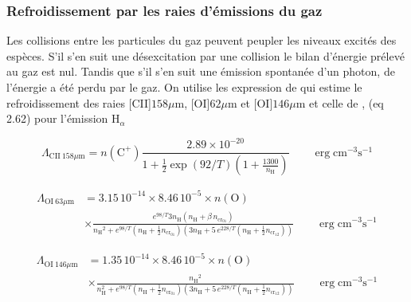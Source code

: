 


\subsubsection{Refroidissement par les raies d'émissions du gaz}

Les collisions entre les particules du gaz peuvent peupler les niveaux excités des espèces. S'il s'en suit une désexcitation par une collision le bilan d'énergie prélevé au gaz est nul. Tandis que s'il s'en suit une émission spontanée d'un photon, de l'énergie a été perdu par le gaz. On utilise les expression de \cite{Rollig2005} qui estime le refroidissement des raies [CII]$158 \mu \mathrm{m}$, [OI]$62 \mu \mathrm{m}$ et [OI]$146 \mu \mathrm{m}$ et celle de \cite{tielens2005}, (eq 2.62) pour l'émission $\mathrm{H}_\alpha$

\begin{equation}
    \Lambda_{\mathrm{CII}\ 158   \mu \mathrm{m}}= n(\mathrm{C}^+) \frac{2.89 \times 10^{-20}}{1+\frac{1}{2} \exp (92 / T)\left(1+\frac{1300}{n_\mathrm{H}}\right)} \qquad \operatorname{erg} \mathrm{cm}^{-3} \mathrm{s}^{-1}
\end{equation}

\begin{equation}
\begin{split}
    \Lambda_{\mathrm{OI}\ 63 \mu \mathrm{m}} &= 3.15\,10^{-14} \times 8.46\,10^{-5} \times 
    n(\mathrm{O}) \\
    & \times \frac{e^{98/T} 3 n_\mathrm{H} (n_\mathrm{H} + \beta\, n_{\mathrm{cr}_{01}} ) }{{n_\mathrm{H}}^2+ e^{98/T}(n_\mathrm{H} + \frac{1}{2} n_{\mathrm{cr}_{01}} ) (3 n_\mathrm{H} + 5\, e^{228/T} (n_\mathrm{H} + \frac{1}{2} n_{\mathrm{cr}_{12}} )) } \qquad \operatorname{erg} \mathrm{cm}^{-3} \mathrm{s}^{-1}
\end{split}
\end{equation}

\begin{equation}
\begin{split}
    \Lambda_{\mathrm{OI}\ 146 \mu \mathrm{m}} &= 1.35\,10^{-14} \times 8.46\,10^{-5} \times 
    n(\mathrm{O}) \\
    & \times \frac{ {n_\mathrm{H}}^2 }{n_\mathrm{H}^2+ e^{98/T}(n_\mathrm{H} + \frac{1}{2} n_{\mathrm{cr}_{01}} ) (3 n_\mathrm{H} + 5\, e^{228/T} (n_\mathrm{H} + \frac{1}{2} n_{\mathrm{cr}_{12}} )) } \qquad \operatorname{erg} \mathrm{cm}^{-3} \mathrm{s}^{-1}
\end{split}
\end{equation}

